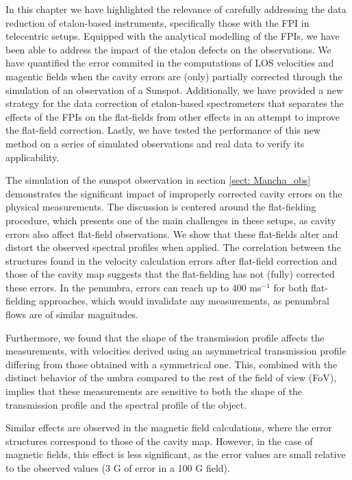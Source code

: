 In this chapter we have highlighted the relevance of carefully addressing the data reduction of etalon-based instruments, specifically those with the FPI in telecentric setups. Equipped with the analytical modelling of the FPIs, we have been able to address the impact of the etalon defects on the observations. We have quantified the error commited in the computations of LOS velocities and magentic fields when the cavity errors are (only) partially corrected through the simulation of an observation of a Sunspot. Additionally, we have provided a new strategy for the data correction of etalon-based spectrometers that separates the effects of the FPIs on the flat-fields from other effects in an attempt to improve the flat-field correction. Lastly, we have tested the performance of this new method on a series of simulated observations and real data to verify its applicability. 

The simulation of the sunspot observation in section \ref{sect: Mancha_obs} demonstrates the significant impact of improperly corrected cavity errors on the physical measurements. The discussion is centered around the flat-fielding procedure, which presents one of the main challenges in these setups, as cavity errors also affect flat-field observations. We show that these flat-fields alter and distort the observed spectral profiles when applied. The correlation between the structures found in the velocity calculation errors after flat-field correction and those of the cavity map suggests that the flat-fielding has not (fully) corrected these errors. In the penumbra, errors can reach up to 400 ms$^{-1}$ for both flat-fielding approaches, which would invalidate any measurements, as penumbral flows are of similar magnitudes.

Furthermore, we found that the shape of the transmission profile affects the measurements, with velocities derived using an asymmetrical transmission profile differing from those obtained with a symmetrical one. This, combined with the distinct behavior of the umbra compared to the rest of the field of view (FoV), implies that these measurements are sensitive to both the shape of the transmission profile and the spectral profile of the object.

Similar effects are observed in the magnetic field calculations, where the error structures correspond to those of the cavity map. However, in the case of magnetic fields, this effect is less significant, as the error values are small relative to the observed values (3 G of error in a 100 G field).

